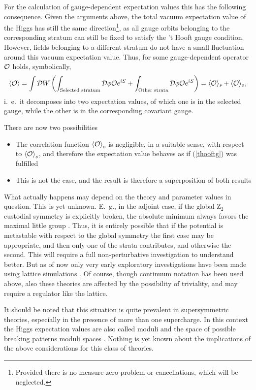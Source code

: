 \documentclass[final,twoside,12pt]{article}
\newcommand*{\be}{\begin{equation}}
\newcommand*{\ee}{\end{equation}}
\newcommand*{\pref}[1]{(\ref{#1})}
\newcommand*{\1}{1\!\!\!\bot}
\newcommand*{\la}{\left\langle}
\newcommand*{\ra}{\right\rangle}
\newcommand*{\op}{{\cal O}}
\begin{document}
For the calculation of gauge-dependent expectation values this has the following consequence. Given the arguments above, the total vacuum expectation value of the Higgs has still the same direction\footnote{Provided there is no measure-zero problem or cancellations, which will be neglected.}, as all gauge orbits belonging to the corresponding stratum can still be fixed to satisfy the 't Hooft gauge condition. However, fields belonging to a different stratum do not have a small fluctuation around this vacuum expectation value. Thus, for some gauge-dependent operator $\op$ holds, symbolically,
\be
\langle\op\rangle=\int{\cal D}W\left(\int_\text{Selected stratum}{\cal D}\phi \op e^{iS}+\int_\text{Other strata}{\cal D}\phi \op e^{iS}\right)=\langle \op\rangle_s+\langle \op\rangle_o\label{mppi},
\ee
\noindent i.\ e.\ it decomposes into two expectation values, of which one is in the selected gauge, while the other is in the corresponding covariant gauge.

There are now two possibilities
\begin{itemize}
 \item The correlation function $\la\op\ra_o$ is negligible, in a suitable sense, with respect to $\la\op\ra_s$, and therefore the expectation value behaves as if \pref{thooftg} was fulfilled
 \item This is not the case, and the result is therefore a superposition of both results
\end{itemize}
What actually happens may depend on the theory and parameter values in question. This is yet unknown. E.\ g., in the adjoint case, if the global Z$_2$ custodial symmetry is explicitly broken, the absolute minimum always favors the maximal little group \cite{O'Raifeartaigh:1986vq}. Thus, it is entirely possible that if the potential is metastable with respect to the global symmetry the first case may be appropriate, and then only one of the strata contributes, and otherwise the second. This will require a full non-perturbative investigation to understand better. But as of now only very early exploratory investigations have been made using lattice simulations \cite{Gupta:1983zv,Lee:1985yi,Olynyk:1985tr,Kikugawa:1985ex,Azcoiti:1987ua}. Of course, though continuum notation has been used above, also these theories are affected by the possibility of triviality, and may require a regulator like the lattice.

It should be noted that this situation is quite prevalent in supersymmetric theories, especially in the presence of more than one supercharge. In this context the Higgs expectation values are also called moduli and the space of possible breaking patterns moduli spaces \cite{Weinberg:2000cr}. Nothing is yet known about the implications of the above considerations for this class of theories.
\end{document}
